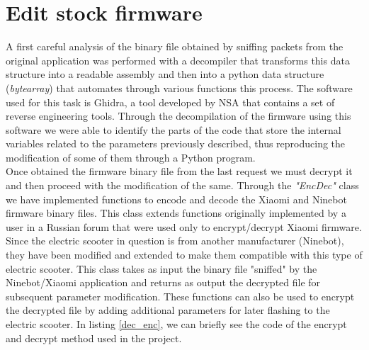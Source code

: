 \documentclass[binding=0.6cm,LaM,noexaminfo]{sapthesis}
\begin{document}
\section{Edit stock firmware}
A first careful analysis of the binary file obtained by sniffing packets from the original application was performed with a decompiler that transforms this data structure into a readable assembly and then into a python data structure (\textit{bytearray}) that automates through various functions this process. The software used for this task is Ghidra, a tool developed by NSA that contains a set of reverse engineering tools. Through the decompilation of the firmware using this software we were able to identify the parts of the code that store the internal variables related to the parameters previously described, thus reproducing the modification of some of them through a Python program. \\
Once obtained the firmware binary file from the last request we must decrypt it and then proceed with the modification of the same. Through the \textit{"EncDec"} class we have implemented functions to encode and decode the Xiaomi and Ninebot firmware binary files. This class extends functions originally implemented by a user in a Russian forum that were used only to encrypt/decrypt Xiaomi firmware. Since the electric scooter in question is from another manufacturer (Ninebot), they have been modified and extended to make them compatible with this type of electric scooter. This class takes as input the binary file "sniffed" by the Ninebot/Xiaomi application and returns as output the decrypted file for subsequent parameter modification. These functions can also be used to encrypt the decrypted file by adding additional parameters for later flashing to the electric scooter. In listing \ref{dec_enc}, we can briefly see the code of the encrypt and decrypt method used in the project. \\
\end{document}
